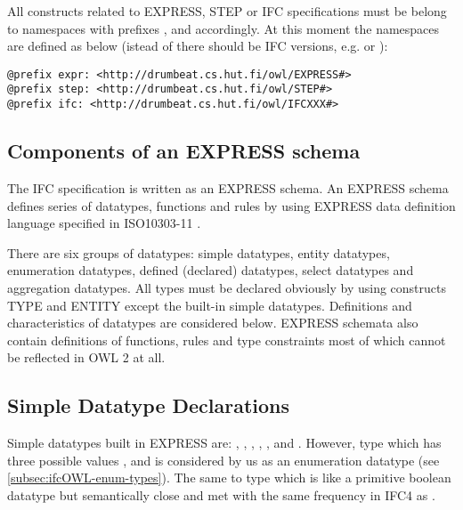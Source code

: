 \begin{ontologyRule}[Namespaces]
All constructs related to EXPRESS, STEP or IFC specifications must be belong to namespaces with prefixes ,  and  accordingly. At this moment the namespaces are defined as below (istead of  there should be IFC versions, e.g.  or ):

\begin{lstlisting}
@prefix expr: <http://drumbeat.cs.hut.fi/owl/EXPRESS#>
@prefix step: <http://drumbeat.cs.hut.fi/owl/STEP#>
@prefix ifc: <http://drumbeat.cs.hut.fi/owl/IFCXXX#>
\end{lstlisting}
\end{ontologyRule}


\subsection{Components of an EXPRESS schema}
The IFC specification is written as an EXPRESS schema. An EXPRESS schema defines series of data\-types, functions and rules by using EXPRESS data definition language specified in ISO10303-11 \cite{wiki:express,noauthor:ifc-guide}.

There are six groups of data\-types: simple data\-types, entity data\-types, enumeration data\-types, defined (declared) data\-types, select data\-types and aggregation data\-types. All types must be declared obviously by using constructs TYPE and ENTITY except the built-in simple data\-types. Definitions and characteristics of data\-types are considered below. EXPRESS schemata also contain definitions of functions, rules and type constraints most of which cannot be reflected in OWL 2 at all.



\subsection{Simple Datatype Declarations}
\label{subsec:ifcOWL-simple-type}

Simple data\-types built in EXPRESS are: , , , , ,  and . However, type  which has three possible values ,  and  is considered by us as an enumeration data\-type (see \ref{subsec:ifcOWL-enum-types}). The same to type  which is like a primitive boolean data\-type but semantically close and met with the same frequency in IFC4 as .


